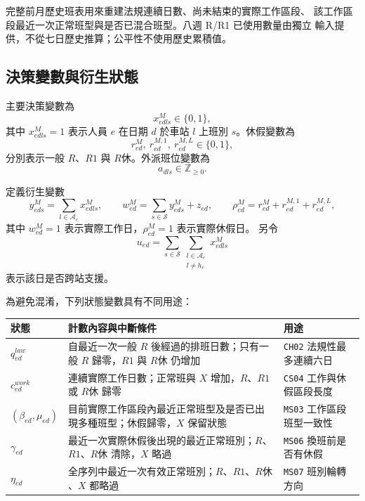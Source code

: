 \documentclass[a4paper,12pt]{article}
\begin{document}
完整前月歷史班表用來重建法規連續日數、尚未結束的實際工作區段、
該工作區段最近一次正常班型與是否已混合班型。八週 R/R1 已使用數量由獨立
輸入提供，不從七日歷史推算；公平性不使用歷史累積值。

\subsection{決策變數與衍生狀態}

主要決策變數為
\[
  x^{M}_{edls}\in\{0,1\},
\]
其中 \(x^{M}_{edls}=1\) 表示人員 \(e\) 在日期 \(d\) 於車站 \(l\) 上班別
\(s\)。休假變數為
\[
  r^{M}_{ed},\ r^{M,1}_{ed},\ r^{M,L}_{ed}\in\{0,1\},
\]
分別表示一般 \(R\)、\(R1\) 與 \(R休\)。外派班位變數為
\[
  a_{dls}\in\mathbb{Z}_{\geq0}.
\]

定義衍生變數
\[
  y^{M}_{eds}=\sum_{l\in\mathcal{A}_e}x^{M}_{edls},
  \qquad
  w^{M}_{ed}=\sum_{s\in\mathcal{S}}y^{M}_{eds}+z_{ed},
  \qquad
  \rho^{M}_{ed}=r^{M}_{ed}+r^{M,1}_{ed}+r^{M,L}_{ed},
\]
其中 \(w^{M}_{ed}=1\) 表示實際工作日，\(\rho^{M}_{ed}=1\) 表示實際休假日。
另令
\[
  u_{ed}
  =
  \sum_{s\in\mathcal{S}}
  \sum_{\substack{l\in\mathcal{A}_e\\l\neq h_e}}x^{M}_{edls}
\]
表示該日是否跨站支援。

為避免混淆，下列狀態變數具有不同用途：

\begin{center}
\small
\begin{tabularx}{\textwidth}{p{2.6cm}X X}
  \toprule
  狀態 & 計數內容與中斷條件 & 用途 \\
  \midrule
  \(q^{law}_{ed}\) & 自最近一次一般 \(R\) 後經過的排班日數；只有一般 \(R\) 歸零，\(R1\) 與 \(R休\) 仍增加 & \texttt{CH02} 法規性最多連續六日 \\
  \(c^{work}_{ed}\) & 連續實際工作日數；正常班與 \(X\) 增加，\(R\)、\(R1\) 或 \(R休\) 歸零 & \texttt{CS04} 工作與休假區段長度 \\
  \((\beta_{ed},\mu_{ed})\) & 目前實際工作區段內最近正常班型及是否已出現多種班型；休假歸零，\(X\) 保留狀態 & \texttt{MS03} 工作區段班型一致性 \\
  \(\gamma_{ed}\) & 最近一次實際休假後出現的最近正常班別；\(R\)、\(R1\)、\(R休\) 清除，\(X\) 略過 & \texttt{MS06} 換班前是否有休假 \\
  \(\eta_{ed}\) & 全序列中最近一次有效正常班別；\(R\)、\(R1\)、\(R休\)、\(X\) 都略過 & \texttt{MS07} 班別輪轉方向 \\
  \bottomrule
\end{tabularx}
\normalsize
\end{center}
\end{document}
